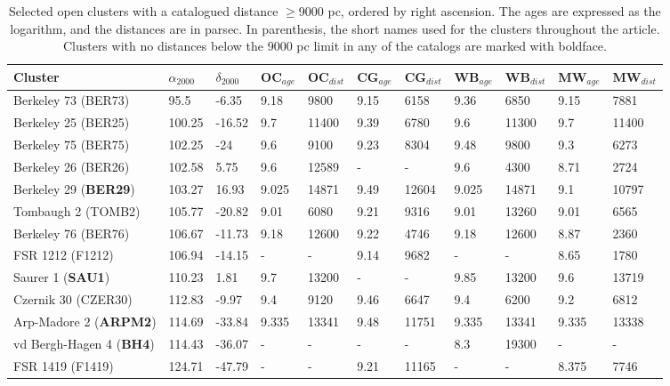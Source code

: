 \documentclass{aa}
\begin{document}
 \begin{table}
 \caption{Selected open clusters with a catalogued distance $\geq$9000 pc,
 ordered by right ascension. The ages are expressed as the logarithm, and the
 distances are in parsec. In parenthesis, the short names used for the clusters
 throughout the article. Clusters with no distances below the 9000 pc limit in
 any of the catalogs are marked with boldface.}
 \label{tab:clusters}
 \centering
 \begin{tabular}{lllllllllll}
 \hline\hline
 Cluster & $\alpha_{2000}$  & $\delta_{2000}$ & OC$_{age}$ & OC$_{dist}$ & CG$_{age}$ &
 CG$_{dist}$ & WB$_{age}$ & WB$_{dist}$ & MW$_{age}$ & MW$_{dist}$ \\
 \hline
 Berkeley 73 (BER73)     & 95.5   & -6.35     & 9.18  & 9800  & 9.15  & 6158  &
 9.36 & 6850 & 9.15  & 7881  \\
 Berkeley 25 (BER25)     & 100.25 & -16.52    & 9.7   & 11400 & 9.39  & 6780  &
 9.6   & 11300 &  9.7   & 11400 \\
 Berkeley  75 (BER75)     & 102.25 & -24       & 9.6   & 9100  & 9.23  &  8304 
 & 9.48  & 9800  & 9.3   & 6273  \\
 Berkeley  26 (BER26)     & 102.58 & 5.75      & 9.6   & 12589 & -   & -   & 9.6
 & 4300  & 8.71  & 2724  \\
 Berkeley  29 (\textbf{BER29})     & 103.27 & 16.93     & 9.025 & 14871 & 9.49  & 12604 &
 9.025 & 14871 & 9.1   & 10797 \\
 Tombaugh 2 (TOMB2)     & 105.77 & -20.82    & 9.01  & 6080  & 9.21  & 9316  &
 9.01 & 13260 & 9.01  & 6565  \\
 Berkeley 76 (BER76)     & 106.67 & -11.73    & 9.18  & 12600 & 9.22  & 4746  &
 9.18 & 12600 & 8.87  & 2360  \\
 FSR 1212 (F1212)   & 106.94 & -14.15    & -   & -   & 9.14  & 9682  & -   & -
 & 8.65  & 1780  \\
 Saurer 1 (\textbf{SAU1})   & 110.23 & 1.81      & 9.7   & 13200 & -   & -   & 9.85  &
 13200 & 9.6   & 13719 \\
 Czernik 30 (CZER30)    & 112.83 & -9.97     & 9.4   & 9120  & 9.46  & 6647  &
 9.4 & 6200  & 9.2   & 6812  \\
 Arp-Madore 2 (\textbf{ARPM2})     & 114.69 & -33.84    & 9.335 & 13341 & 9.48  & 11751 &
 9.335 & 13341 & 9.335 & 13338 \\
 vd Bergh-Hagen 4 (\textbf{BH4})     & 114.43 & -36.07    & -   & -   & -   & -  
 & 8.3   & 19300 & -   & -   \\
 FSR 1419 (F1419)   & 124.71 & -47.79    & -   & -   & 9.21  & 11165 & -   & -   & 8.375 & 7746  \\

\end{tabular}
\end{table}
\end{document}
